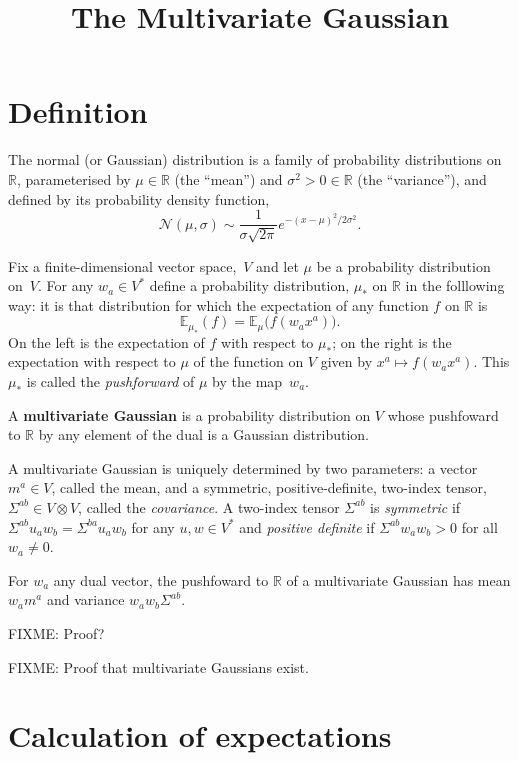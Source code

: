 \documentclass[10pt, a4paper, twocolumn]{article}
\title{The Multivariate Gaussian}
\newcommand{\R}{\mathbb{R}}
\newcommand{\E}{\mathbb{E}}
\newcommand{\N}{\mathcal{N}}
\newcommand{\defn}[1]{\textbf{#1}}
\begin{document}
\maketitle

\section{Definition}

The normal (or Gaussian) distribution is a family of probability distributions
on $\R$, parameterised by $\mu\in\R$ (the “mean”) and $\sigma^2>0 \in\R$ (the “variance”),
and defined by its probability density function,
\begin{equation*}
  \N(\mu, \sigma) \sim \frac{1}{\sigma\sqrt{2\pi}} e^{-(x-\mu)^2/2\sigma^2}.
\end{equation*}

Fix a finite-dimensional vector space,~$V$ and let $\mu$ be a probability
distribution on~$V$. For any $w_a \in V^*$ define a probability distribution,
$\mu_*$ on $\R$ in the folllowing way: it is that distribution for which the
expectation of any function $f$ on $\R$ is
\begin{equation*}
\E_{\mu_*}(f) = \E_\mu\bigl(f(w_a x^a)\bigr). 
\end{equation*}
On the left is the expectation of $f$ with respect to $\mu_*$; on the right is the
expectation with respect to $\mu$ of the function on $V$ given by $x^ a\mapsto f(w_a
x^a)$. This $\mu_*$ is called the \emph{pushforward} of $\mu$ by the map~$w_a$.

A \defn{multivariate Gaussian} is a probability distribution on $V$ whose
pushfoward to $\R$ by any element of the dual is a Gaussian distribution.

A multivariate Gaussian is uniquely determined by two parameters: a vector $m^a\in
V$, called the mean, and a symmetric, positive-definite, two-index tensor,
$\Sigma^{ab}\in V\otimes V$, called the \emph{covariance}. A two-index tensor $\Sigma^{ab}$ is
\emph{symmetric} if $\Sigma^{ab}u_a w_b = \Sigma^{ba} u_a w_b$ for any $u, w\in V^*$ and
\emph{positive definite} if $\Sigma^{ab}w_a w_b > 0$ for all $w_a\neq 0$.

For $w_a$ any dual vector, the pushfoward to $\R$ of a multivariate Gaussian has
mean $w_a m^a$ and variance $w_a w_b \Sigma^{ab}$.

FIXME: Proof?

FIXME: Proof that multivariate Gaussians exist.

\section{Calculation of expectations}
\end{document}
